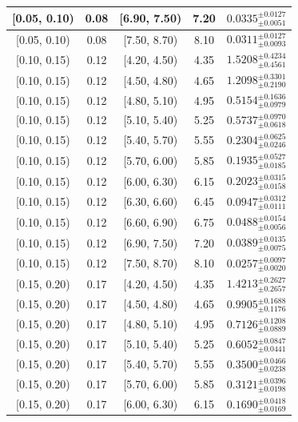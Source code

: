 \begin{longtable}{|c|c|c|c|c|}
\hline
[0.05, 0.10) & 0.08 & [6.90, 7.50) & 7.20 & $0.0335^{ \pm 0.0127 }_{ \pm 0.0051 }$ \\ 
\hline
[0.05, 0.10) & 0.08 & [7.50, 8.70) & 8.10 & $0.0311^{ \pm 0.0127 }_{ \pm 0.0093 }$ \\ 
\hline
[0.10, 0.15) & 0.12 & [4.20, 4.50) & 4.35 & $1.5208^{ \pm 0.4234 }_{ \pm 0.4561 }$ \\ 
\hline
[0.10, 0.15) & 0.12 & [4.50, 4.80) & 4.65 & $1.2098^{ \pm 0.3301 }_{ \pm 0.2190 }$ \\ 
\hline
[0.10, 0.15) & 0.12 & [4.80, 5.10) & 4.95 & $0.5154^{ \pm 0.1636 }_{ \pm 0.0979 }$ \\ 
\hline
[0.10, 0.15) & 0.12 & [5.10, 5.40) & 5.25 & $0.5737^{ \pm 0.0970 }_{ \pm 0.0618 }$ \\ 
\hline
[0.10, 0.15) & 0.12 & [5.40, 5.70) & 5.55 & $0.2304^{ \pm 0.0625 }_{ \pm 0.0246 }$ \\ 
\hline
[0.10, 0.15) & 0.12 & [5.70, 6.00) & 5.85 & $0.1935^{ \pm 0.0527 }_{ \pm 0.0185 }$ \\ 
\hline
[0.10, 0.15) & 0.12 & [6.00, 6.30) & 6.15 & $0.2023^{ \pm 0.0315 }_{ \pm 0.0158 }$ \\ 
\hline
[0.10, 0.15) & 0.12 & [6.30, 6.60) & 6.45 & $0.0947^{ \pm 0.0312 }_{ \pm 0.0111 }$ \\ 
\hline
[0.10, 0.15) & 0.12 & [6.60, 6.90) & 6.75 & $0.0488^{ \pm 0.0154 }_{ \pm 0.0056 }$ \\ 
\hline
[0.10, 0.15) & 0.12 & [6.90, 7.50) & 7.20 & $0.0389^{ \pm 0.0135 }_{ \pm 0.0075 }$ \\ 
\hline
[0.10, 0.15) & 0.12 & [7.50, 8.70) & 8.10 & $0.0257^{ \pm 0.0097 }_{ \pm 0.0020 }$ \\ 
\hline
[0.15, 0.20) & 0.17 & [4.20, 4.50) & 4.35 & $1.4213^{ \pm 0.2627 }_{ \pm 0.2657 }$ \\ 
\hline
[0.15, 0.20) & 0.17 & [4.50, 4.80) & 4.65 & $0.9905^{ \pm 0.1688 }_{ \pm 0.1176 }$ \\ 
\hline
[0.15, 0.20) & 0.17 & [4.80, 5.10) & 4.95 & $0.7126^{ \pm 0.1208 }_{ \pm 0.0889 }$ \\ 
\hline
[0.15, 0.20) & 0.17 & [5.10, 5.40) & 5.25 & $0.6052^{ \pm 0.0847 }_{ \pm 0.0441 }$ \\ 
\hline
[0.15, 0.20) & 0.17 & [5.40, 5.70) & 5.55 & $0.3500^{ \pm 0.0466 }_{ \pm 0.0238 }$ \\ 
\hline
[0.15, 0.20) & 0.17 & [5.70, 6.00) & 5.85 & $0.3121^{ \pm 0.0396 }_{ \pm 0.0198 }$ \\ 
\hline
[0.15, 0.20) & 0.17 & [6.00, 6.30) & 6.15 & $0.1690^{ \pm 0.0418 }_{ \pm 0.0169 }$ \\ 

\end{longtable}
